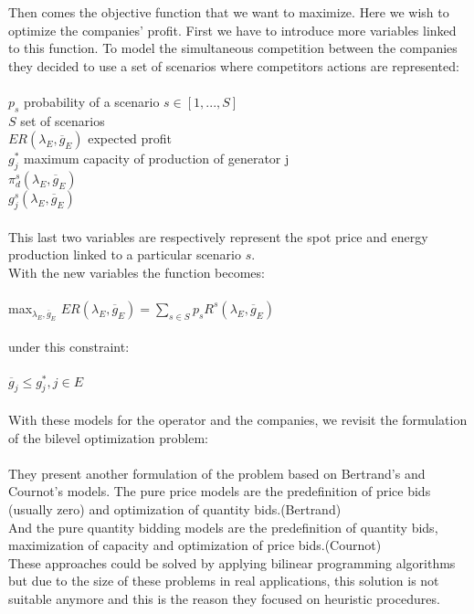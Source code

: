 \documentclass[letterpaper]{article}
\begin{document}
Then comes the objective function that we want to maximize. Here we wish to optimize the companies' profit. First we have to introduce more variables linked to this function. To model the simultaneous competition between the companies they decided to use a set of scenarios where competitors actions are represented:\\ \\
$p_s$ probability of a scenario $s \in [1,...,S]$\\
$S$ set of scenarios \\
$ER(\lambda_E,\overline{g}_E)$ expected profit\\
$g^*_j$ maximum capacity of production of generator j \\
$\pi^s_d(\lambda_E,\overline{g}_E)$ \\ 
$g^s_j(\lambda_E,\overline{g}_E)$ \\ \\
This last two variables are respectively represent the spot price and energy production linked to a particular scenario $s$.\\
With the new variables the function becomes:\\ \\
max$_{\lambda_E , \overline{g}_E}$ $ER(\lambda_E,\overline{g}_E) = \sum_{s \in S} p_s R^s (\lambda_E , \overline{g}_E)$\\ \\
under this constraint: \\ \\
$\overline{g}_j \leq g^*_j, j \in E$ \\ \\
With these models for the operator and the companies, we revisit the formulation of the bilevel optimization problem: \\ \\
They present another formulation of the problem based on Bertrand's and Cournot's models.
The pure price models are the predefinition of price bids (usually zero) and optimization of quantity bids.(Bertrand) \\
And the pure quantity bidding models are the predefinition of quantity bids, maximization of capacity and optimization of price bids.(Cournot)
\\
These approaches could be solved by applying bilinear programming algorithms but due to the size of these problems in real applications, this solution is not suitable anymore and this is the reason they focused on heuristic procedures.
\end{document}
